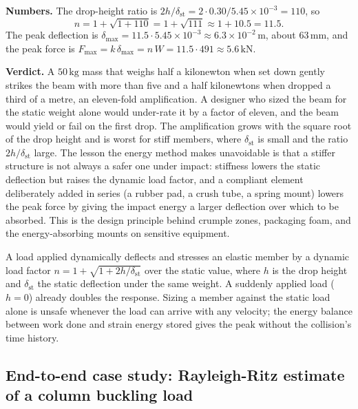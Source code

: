 

\textbf{Numbers.} The drop-height ratio is $2h/\delta_\text{st} =
2\cdot 0.30/5.45\times 10^{-3} = 110$, so
\[
n = 1 + \sqrt{1 + 110} = 1 + \sqrt{111} \approx 1 + 10.5 = 11.5.
\]
The peak deflection is $\delta_\text{max} = 11.5 \cdot 5.45\times 10^{-3}
\approx 6.3\times 10^{-2}\,\si{\meter}$, about $63\,\si{\milli\meter}$,
and the peak force is $F_\text{max} = k\,\delta_\text{max} = n\,W = 11.5
\cdot 491 \approx 5.6\,\si{\kilo\newton}$.

\textbf{Verdict.} A $50\,\si{\kilogram}$ mass that weighs half a
kilonewton when set down gently strikes the beam with more than five and
a half kilonewtons when dropped a third of a metre, an eleven-fold
amplification. A designer who sized the beam for the static weight alone
would under-rate it by a factor of eleven, and the beam would yield or
fail on the first drop. The amplification grows with the square root of
the drop height and is worst for stiff members, where $\delta_\text{st}$
is small and the ratio $2h/\delta_\text{st}$ large. The lesson the energy
method makes unavoidable is that a stiffer structure is not always a
safer one under impact: stiffness lowers the static deflection but raises
the dynamic load factor, and a compliant element deliberately added in
series (a rubber pad, a crush tube, a spring mount) lowers the peak force
by giving the impact energy a larger deflection over which to be
absorbed. This is the design principle behind crumple zones, packaging
foam, and the energy-absorbing mounts on sensitive equipment.

\begin{principle}
A load applied dynamically deflects and stresses an elastic member by a
dynamic load factor $n = 1 + \sqrt{1 + 2h/\delta_\text{st}}$ over the
static value, where $h$ is the drop height and $\delta_\text{st}$ the
static deflection under the same weight. A suddenly applied load ($h=0$)
already doubles the response. Sizing a member against the static load
alone is unsafe whenever the load can arrive with any velocity; the
energy balance between work done and strain energy stored gives the peak
without the collision's time history.
\end{principle}

\subsection{End-to-end case study: Rayleigh-Ritz estimate of a column
buckling load}

